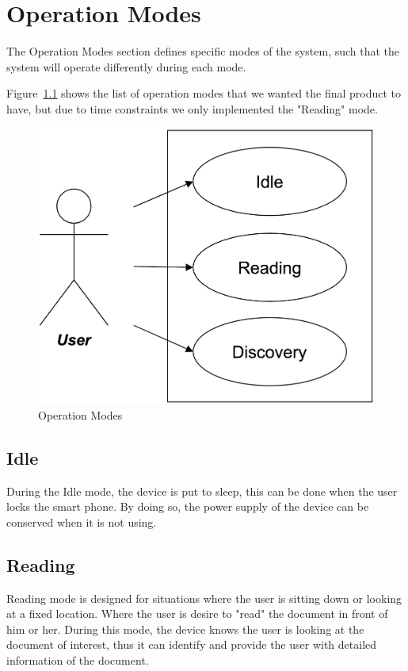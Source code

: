 \chapter{Operation Modes}
The Operation Modes section defines specific modes of the system, such that the system will operate differently during each mode.

Figure~\ref{useCase} shows the list of operation modes that we wanted the final product to have, but due to time constraints we only implemented the "Reading" mode.

\begin{figure}
	
	\centering
	\includegraphics[scale = 0.15]{useCase.png}
    
    \caption{Operation Modes}
    \label{useCase}
\end{figure}

\pagebreak

\section{Idle}
During the Idle mode, the device is put to sleep, this can be done when the user locks the smart phone. By doing so, the power supply of the device can be conserved when it is not using.

\section{Reading}
Reading mode is designed for situations where the user is sitting down or looking at a fixed location. Where the user is desire to "read" the document in front of him or her. During this mode, the device knows the user is looking at the document of interest, thus it can identify and provide the user with detailed information of the document.

